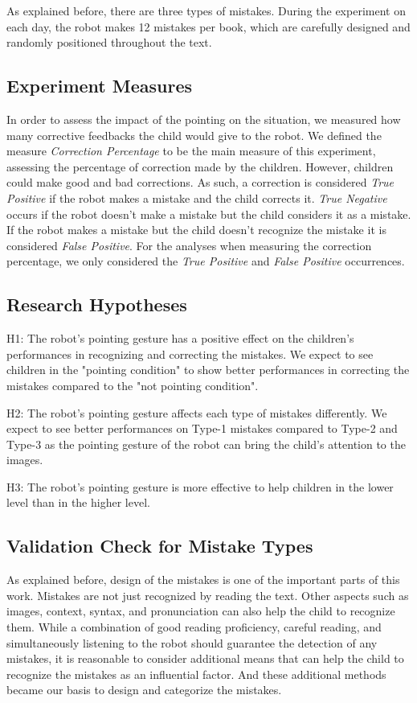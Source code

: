 \documentclass{sigchi}
\begin{document}
As explained before, there are three types of mistakes. 
During the experiment on each day, the robot makes 12 mistakes per book, which are carefully designed and randomly positioned throughout the text.


\subsection{Experiment Measures}
In order to assess the impact of the pointing on the situation, we measured how many corrective feedbacks the child would give to the robot. 
We defined the measure \textit{Correction Percentage} to be the main measure of this experiment, assessing the percentage of correction made by the children. 
However, children could make good and bad corrections. 
As such, a correction is considered \textit{True Positive} if the robot makes a mistake and the child corrects it. 
\textit{True Negative} occurs if the robot doesn't make a mistake but the child considers it as a mistake.
If the robot makes a mistake but the child doesn't recognize the mistake it is considered \textit{False Positive}. 
For the analyses when measuring the correction percentage, we only considered the \textit{True Positive} and \textit{False Positive} occurrences. 


\subsection{Research Hypotheses}

H1: The robot's pointing gesture has a positive effect on the children's performances in recognizing and correcting the mistakes. We expect to see children in the "pointing condition" to show better performances in correcting the mistakes compared to the "not pointing condition".

H2: The robot's pointing gesture affects each type of mistakes differently. We expect to see better performances on Type-1 mistakes compared to Type-2 and Type-3 as the pointing gesture of the robot can bring the child's attention to the images. 

H3: The robot's pointing gesture is more effective to help children in the lower level than in the higher level.  





\subsection{Validation Check for Mistake Types}
As explained before,  design of the mistakes is one of the important parts of this work.
Mistakes are not just recognized by reading the text. Other aspects such as images, context, syntax, and pronunciation can also help the child to recognize them.
While a combination of good reading proficiency, careful reading, and simultaneously listening to the robot should guarantee the detection of any mistakes, it is reasonable to consider additional means that can help the child to recognize the mistakes as an influential factor.  
And these additional methods became our basis to design and categorize the mistakes.
\end{document}
